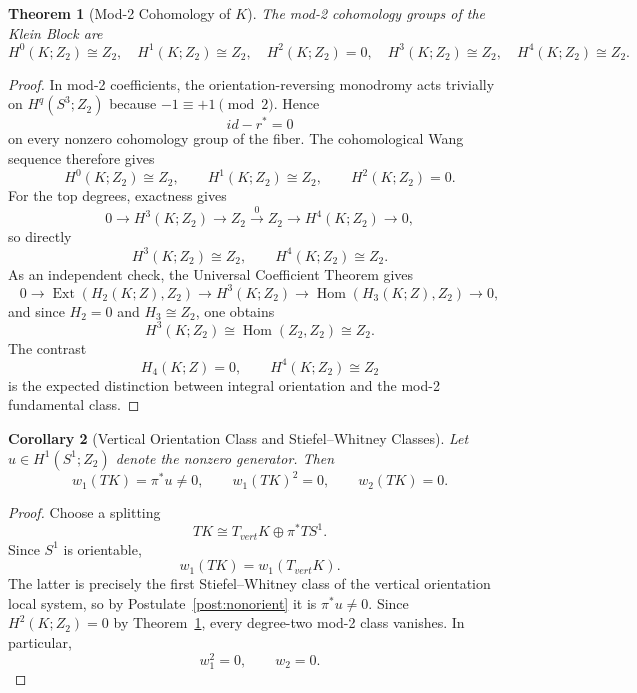 \documentclass[11pt]{article}
\theoremstyle{canonmath}
\newtheorem{theorem}{Theorem}[section]
\newtheorem{corollary}[theorem]{Corollary}
\theoremstyle{canonpostulate}
\theoremstyle{canonproposition}
\providecommand{\Klein}{\mathcal{K}}
\providecommand{\Z}{\mathbb{Z}}
\providecommand{\Ztwo}{\mathbb{Z}_2}
\providecommand{\Sone}{S^1}
\providecommand{\Sthree}{S^3}
\providecommand{\id}{\mathrm{id}}
\providecommand{\Hom}{\operatorname{Hom}}
\providecommand{\Ext}{\operatorname{Ext}}
\def\mathrm#1{#1}%
\def\mathbb#1{#1}%
\def\mathcal#1{#1}%
\begin{document}
\begin{theorem}[Mod-2 Cohomology of $\Klein$] \label{thm:mod2}
The mod-2 cohomology groups of the Klein Block are
\begin{equation}
    H^0(\Klein;\Ztwo)\cong\Ztwo,\quad
    H^1(\Klein;\Ztwo)\cong\Ztwo,\quad
    H^2(\Klein;\Ztwo)=0,\quad
    H^3(\Klein;\Ztwo)\cong\Ztwo,\quad
    H^4(\Klein;\Ztwo)\cong\Ztwo.
\end{equation}
\end{theorem}
\begin{proof}
In mod-2 coefficients, the orientation-reversing monodromy acts trivially on $H^q(\Sthree;\Ztwo)$ because $-1\equiv+1\pmod2$. Hence
\[
\id-r^*=0
\]
on every nonzero cohomology group of the fiber. The cohomological Wang sequence therefore gives
\[
H^0(\Klein;\Ztwo)\cong\Ztwo,
\qquad
H^1(\Klein;\Ztwo)\cong\Ztwo,
\qquad
H^2(\Klein;\Ztwo)=0.
\]
For the top degrees, exactness gives
\[
0\to H^3(\Klein;\Ztwo)\to\Ztwo\xrightarrow{0}\Ztwo\to H^4(\Klein;\Ztwo)\to0,
\]
so directly
\[
H^3(\Klein;\Ztwo)\cong\Ztwo,
\qquad
H^4(\Klein;\Ztwo)\cong\Ztwo.
\]
As an independent check, the Universal Coefficient Theorem gives
\[
0\to \Ext(H_2(\Klein;\Z),\Ztwo)
\to H^3(\Klein;\Ztwo)
\to \Hom(H_3(\Klein;\Z),\Ztwo)
\to0,
\]
and since $H_2=0$ and $H_3\cong\Ztwo$, one obtains
\[
H^3(\Klein;\Ztwo)\cong\Hom(\Ztwo,\Ztwo)\cong\Ztwo.
\]
The contrast
\[
H_4(\Klein;\Z)=0,
\qquad
H^4(\Klein;\Ztwo)\cong\Ztwo
\]
is the expected distinction between integral orientation and the mod-2 fundamental class.
\end{proof}

\begin{corollary}[Vertical Orientation Class and Stiefel--Whitney Classes] \label{cor:SW}
Let $u\in H^1(\Sone;\Ztwo)$ denote the nonzero generator. Then
\begin{equation}
    w_1(T\Klein)=\pi^*u\neq0,
    \qquad
    w_1(T\Klein)^2=0,
    \qquad
    w_2(T\Klein)=0.
\end{equation}
\end{corollary}
\begin{proof}
Choose a splitting
\[
T\Klein\cong T_{\mathrm{vert}}\Klein\oplus\pi^*T\Sone.
\]
Since $\Sone$ is orientable,
\[
 w_1(T\Klein)=w_1(T_{\mathrm{vert}}\Klein).
\]
The latter is precisely the first Stiefel--Whitney class of the vertical orientation local system, so by Postulate~\ref{post:nonorient} it is $\pi^*u\neq0$. Since $H^2(\Klein;\Ztwo)=0$ by Theorem~\ref{thm:mod2}, every degree-two mod-2 class vanishes. In particular,
\[
w_1^2=0,
\qquad
w_2=0.
\]
\end{proof}
\end{document}
